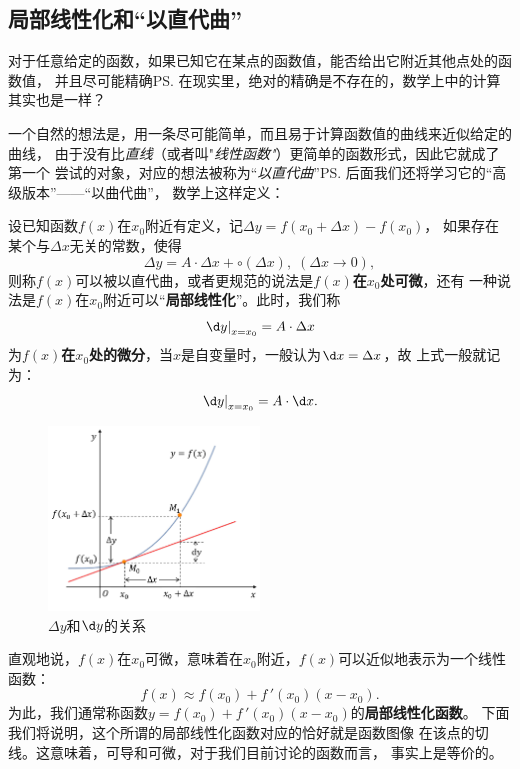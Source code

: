 \subsection{局部线性化和“以直代曲”}

对于任意给定的函数，如果已知它在某点的函数值，能否给出它附近其他点处的函数值，
并且尽可能精确\ps{在现实里，绝对的精确是不存在的，数学上中的计算其实也是一样}？

一个自然的想法是，用一条尽可能简单，而且易于计算函数值的曲线来近似给定的曲线，
由于没有比{\it 直线}（或者叫"{\it 线性函数"}）更简单的函数形式，因此它就成了第一个
尝试的对象，对应的想法被称为“{\it 以直代曲}”\ps{后面我们还将学习它的“高级版本”——“以曲代曲”}，
数学上这样定义：
\begin{thx}
	设已知函数$f(x)$在$x_0$附近有定义，记$\Delta y=f(x_0+\Delta x)-f(x_0)$，
	如果存在某个与$\Delta x$无关的常数，使得
	$$\Delta y=A\cdot\Delta x+\circ(\Delta x),\;(\Delta x\to 0),$$
	则称$f(x)$可以被以直代曲，或者更规范的说法是{\bf $f(x)$在$x_0$处可微}，还有
	一种说法是$f(x)$在$x_0$附近可以“{\bf 局部线性化}”。此时，我们称
	$$\left.\d y\right|_{x=x_0}=A\cdot\Delta x$$
	为{\bf $f(x)$在$x_0$处的微分}，当$x$是自变量时，一般认为$\d x=\Delta x$，故
	上式一般就记为：
	$$\left.\d y\right|_{x=x_0}=A\cdot\d x.$$
\end{thx}
	
\begin{figure}[h]
	\centering
	\includegraphics[width=0.5\textwidth]{./Images/Ch02/dyDy.pdf}
	\caption{$\Delta y$和$\d y$的关系}
	\label{fig:dyDy}
\end{figure}
	
直观地说，$f(x)$在$x_0$可微，意味着在$x_0$附近，$f(x)$可以近似地表示为一个线性函数： 
$$f(x)\approx f(x_0)+f\,'(x_0)(x-x_0).$$
为此，我们通常称函数$y=f(x_0)+f\,'(x_0)(x-x_0)$的{\bf 局部线性化函数}。
下面我们将说明，这个所谓的局部线性化函数对应的恰好就是函数图像
在该点的切线。这意味着，可导和可微，对于我们目前讨论的函数而言，
事实上是等价的。

